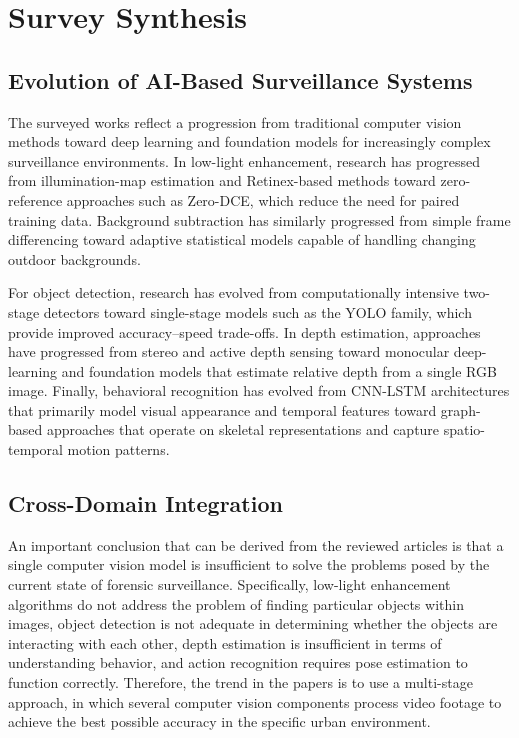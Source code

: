 \documentclass[conference]{IEEEtran}
\begin{document}
\section{Survey Synthesis}
\subsection{Evolution of AI-Based Surveillance Systems}

The surveyed works reflect a progression from traditional computer vision
methods toward deep learning and foundation models for increasingly
complex surveillance environments. In low-light enhancement, research
has progressed from illumination-map estimation and Retinex-based
methods toward zero-reference approaches such as Zero-DCE, which reduce
the need for paired training data. Background subtraction has similarly
progressed from simple frame differencing toward adaptive statistical
models capable of handling changing outdoor backgrounds.

For object detection, research has evolved from computationally
intensive two-stage detectors toward single-stage models such as the
YOLO family, which provide improved accuracy--speed trade-offs. In depth
estimation, approaches have progressed from stereo and active depth
sensing toward monocular deep-learning and foundation models that
estimate relative depth from a single RGB image. Finally, behavioral
recognition has evolved from CNN-LSTM architectures that primarily model
visual appearance and temporal features toward graph-based approaches
that operate on skeletal representations and capture spatio-temporal
motion patterns.

\subsection{Cross-Domain Integration}

An important conclusion that can be derived from the reviewed articles is that a single computer vision model is insufficient to solve the problems posed by the current state of forensic surveillance. Specifically, low-light enhancement algorithms do not address the problem of finding particular objects within images, object detection is not adequate in determining whether the objects are interacting with each other, depth estimation is insufficient in terms of understanding behavior, and action recognition requires pose estimation to function correctly. Therefore, the trend in the papers is to use a multi-stage approach, in which several computer vision components process video footage to achieve the best possible accuracy in the specific urban environment.
\end{document}
